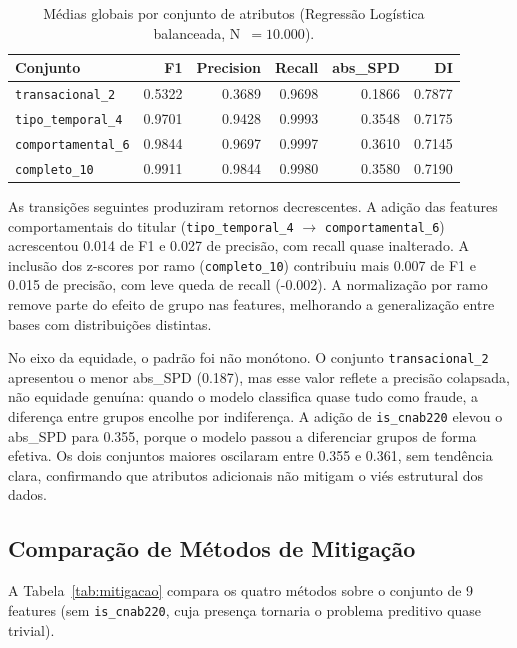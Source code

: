 \begin{table}[H]
\centering
\caption{Médias globais por conjunto de atributos (Regressão Logística
balanceada, N~$= 10.000$).}
\label{tab:features}
\begin{tabular}{lrrrrr}
\toprule
\textbf{Conjunto} & \textbf{F1} & \textbf{Precision} & \textbf{Recall}
  & \textbf{abs\_SPD} & \textbf{DI} \\
\midrule
\texttt{transacional\_2}   & 0.5322 & 0.3689 & 0.9698 & 0.1866 & 0.7877 \\
\texttt{tipo\_temporal\_4} & 0.9701 & 0.9428 & 0.9993 & 0.3548 & 0.7175 \\
\texttt{comportamental\_6} & 0.9844 & 0.9697 & 0.9997 & 0.3610 & 0.7145 \\
\texttt{completo\_10}      & 0.9911 & 0.9844 & 0.9980 & 0.3580 & 0.7190 \\
\bottomrule
\end{tabular}
\end{table}

As transições seguintes produziram retornos decrescentes. A adição das features comportamentais do titular (\texttt{tipo\_temporal\_4} $\to$ \texttt{comportamental\_6}) acrescentou 0.014 de F1 e 0.027 de precisão, com recall quase inalterado. A inclusão dos z-scores por ramo (\texttt{completo\_10}) contribuiu mais 0.007 de F1 e 0.015 de precisão, com leve queda de recall (-0.002). A normalização por ramo remove parte do efeito de grupo nas features, melhorando a generalização entre bases com distribuições distintas.

No eixo da equidade, o padrão foi não monótono. O conjunto \texttt{transacional\_2} apresentou o menor abs\_SPD (0.187), mas esse valor reflete a precisão colapsada, não equidade genuína: quando o modelo classifica quase tudo como fraude, a diferença entre grupos encolhe por indiferença. A adição de \texttt{is\_cnab220} elevou o abs\_SPD para 0.355, porque o modelo passou a diferenciar grupos de forma efetiva. Os dois conjuntos maiores oscilaram entre 0.355 e 0.361, sem tendência clara, confirmando que atributos adicionais não mitigam o viés estrutural dos dados.

\subsection{Comparação de Métodos de Mitigação}
\label{sec:mitigacao}

A Tabela~\ref{tab:mitigacao} compara os quatro métodos sobre o conjunto de 9 features (sem \texttt{is\_cnab220}, cuja presença tornaria o problema preditivo quase trivial).

